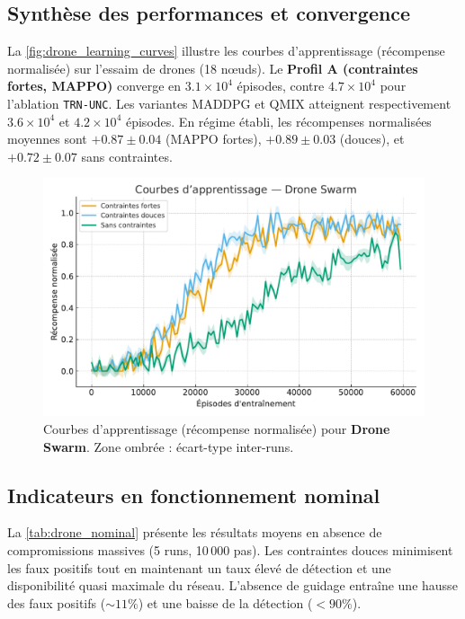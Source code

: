 \subsection*{Synthèse des performances et convergence}

La \autoref{fig:drone_learning_curves} illustre les courbes d’apprentissage (récompense normalisée) sur l’essaim de drones (18 nœuds).
Le \textbf{Profil A (contraintes fortes, MAPPO)} converge en $3.1\times 10^4$ épisodes, contre $4.7\times 10^4$ pour l’ablation \texttt{TRN-UNC}.
Les variantes MADDPG et QMIX atteignent respectivement $3.6\times 10^4$ et $4.2\times 10^4$ épisodes.
En régime établi, les récompenses normalisées moyennes sont $+0.87 \pm 0.04$ (MAPPO fortes), $+0.89 \pm 0.03$ (douces), et $+0.72 \pm 0.07$ sans contraintes.

\begin{figure}[h!]
  \centering
  \includegraphics[width=0.75\linewidth]{figures/results_drone_learning.pdf}
  \caption{Courbes d’apprentissage (récompense normalisée) pour \textbf{Drone Swarm}. Zone ombrée : écart-type inter-runs.}
  \label{fig:drone_learning_curves}
\end{figure}

\subsection*{Indicateurs en fonctionnement nominal}

La \autoref{tab:drone_nominal} présente les résultats moyens en absence de compromissions massives (5 runs, 10\,000 pas).
Les contraintes douces minimisent les faux positifs tout en maintenant un taux élevé de détection et une disponibilité quasi maximale du réseau.
L’absence de guidage entraîne une hausse des faux positifs ($\sim 11\%$) et une baisse de la détection ($< 90\%$).

